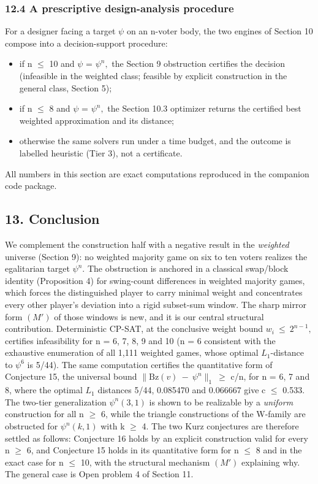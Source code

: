 \documentclass[
]{article}
\providecommand{\tightlist}{%
  \setlength{\itemsep}{0pt}\setlength{\parskip}{0pt}}
\begin{document}
\subsubsection{12.4 A prescriptive design-analysis
procedure}\label{a-prescriptive-design-analysis-procedure}

For a designer facing a target \(\psi\) on an n-voter body, the two
engines of Section 10 compose into a decision-support procedure:

\begin{itemize}
\tightlist
\item
  if n \(\le\) 10 and \(\psi\) = \(\psi^n,\) the Section 9 obstruction
  certifies the decision (infeasible in the weighted class; feasible by
  explicit construction in the general class, Section 5);
\item
  if n \(\le\) 8 and \(\psi\) = \(\psi^n,\) the Section 10.3 optimizer
  returns the certified best weighted approximation and its distance;
\item
  otherwise the same solvers run under a time budget, and the outcome is
  labelled heuristic (Tier 3), not a certificate.
\end{itemize}

All numbers in this section are exact computations reproduced in the
companion code package.

\subsection{13. Conclusion}\label{conclusion}

We complement the construction half with a negative result in the
\emph{weighted} universe (Section 9): no weighted majority game on six
to ten voters realizes the egalitarian target \(\psi^n.\) The
obstruction is anchored in a classical swap/block identity (Proposition
4) for swing-count differences in weighted majority games, which forces
the distinguished player to carry minimal weight and concentrates every
other player's deviation into a rigid subset-sum window. The sharp
mirror form \((M')\) of those windows is new, and it is our central
structural contribution. Deterministic CP-SAT, at the conclusive weight
bound \(w_i\ \le\ 2^{n-1},\) certifies infeasibility for n = 6, 7, 8, 9
and 10 (n = 6 consistent with the exhaustive enumeration of all 1,111
weighted games, whose optimal \(L_1\)-distance to \(\psi^6\) is 5/44).
The same computation certifies the quantitative form of Conjecture 15,
the universal bound \(\|\mathrm{Bz}(v)\ -\ \psi^n\|_1\ \ge\) c/n, for n
= 6, 7 and 8, where the optimal \(L_1\) distances 5/44, 0.085470 and
0.066667 give c \(\le\) 0.533. The two-tier generalization
\(\psi^n(3,1)\) is shown to be realizable by a \emph{uniform}
construction for all n \(\ge\) 6, while the triangle constructions of
the W-family are obstructed for \(\psi^n(k,1)\) with k \(\ge\) 4. The
two Kurz conjectures are therefore settled as follows: Conjecture 16
holds by an explicit construction valid for every n \(\ge\) 6, and
Conjecture 15 holds in its quantitative form for n \(\le\) 8 and in the
exact case for n \(\le\) 10, with the structural mechanism \((M')\)
explaining why. The general case is Open problem 4 of Section 11.
\end{document}
